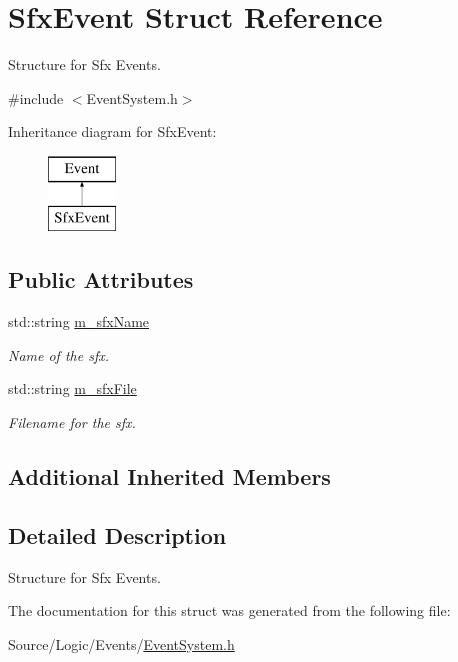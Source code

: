 \hypertarget{struct_sfx_event}{}\section{Sfx\+Event Struct Reference}
\label{struct_sfx_event}


Structure for Sfx Events.  




{\ttfamily \#include $<$Event\+System.\+h$>$}

Inheritance diagram for Sfx\+Event\+:\begin{figure}[H]
\begin{center}
\leavevmode
\includegraphics[height=2.000000cm]{struct_sfx_event}
\end{center}
\end{figure}
\subsection*{Public Attributes}
\begin{DoxyCompactItemize}
\item 
\mbox{\label{struct_sfx_event_a1c70334abf08d52d4916b345b80df8e5}} 
std\+::string \mbox{\hyperlink{struct_sfx_event_a1c70334abf08d52d4916b345b80df8e5}{m\+\_\+sfx\+Name}}
\begin{DoxyCompactList}\small\item\em Name of the sfx. \end{DoxyCompactList}\item 
\mbox{\label{struct_sfx_event_a8fa9bf1c45b7deeb673b0d161f92bd7a}} 
std\+::string \mbox{\hyperlink{struct_sfx_event_a8fa9bf1c45b7deeb673b0d161f92bd7a}{m\+\_\+sfx\+File}}
\begin{DoxyCompactList}\small\item\em Filename for the sfx. \end{DoxyCompactList}\end{DoxyCompactItemize}
\subsection*{Additional Inherited Members}


\subsection{Detailed Description}
Structure for Sfx Events. 

The documentation for this struct was generated from the following file\+:\begin{DoxyCompactItemize}
\item 
Source/\+Logic/\+Events/\mbox{\hyperlink{_event_system_8h}{Event\+System.\+h}}\end{DoxyCompactItemize}
